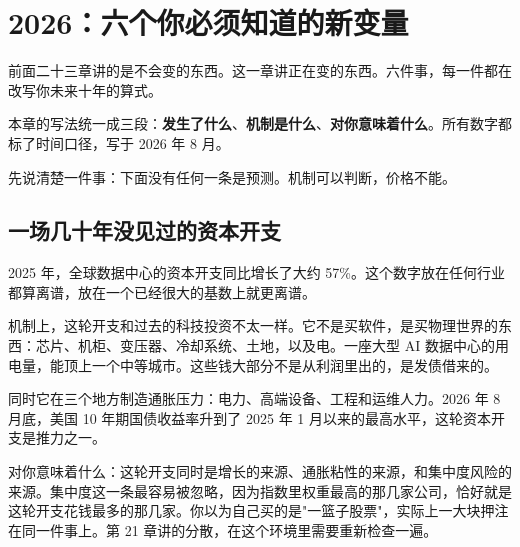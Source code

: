 \chapter{2026：六个你必须知道的新变量}

\begin{ledetext}
前面二十三章讲的是不会变的东西。这一章讲正在变的东西。六件事，每一件都在改写你未来十年的算式。
\end{ledetext}

本章的写法统一成三段：\textbf{发生了什么}、\textbf{机制是什么}、\textbf{对你意味着什么}。所有数字都标了时间口径，写于 2026 年 8 月。

先说清楚一件事：下面没有任何一条是预测。机制可以判断，价格不能。

\section{一场几十年没见过的资本开支}

2025 年，全球数据中心的资本开支同比增长了大约 57\%。这个数字放在任何行业都算离谱，放在一个已经很大的基数上就更离谱。

机制上，这轮开支和过去的科技投资不太一样。它不是买软件，是买物理世界的东西：芯片、机柜、变压器、冷却系统、土地，以及电。一座大型 AI 数据中心的用电量，能顶上一个中等城市。这些钱大部分不是从利润里出的，是发债借来的。

\begin{chainflow}
\chainarrow {}\chainarrow {}\chainarrow {}\chainarrow {}\chainarrow {}
\end{chainflow}

同时它在三个地方制造通胀压力：电力、高端设备、工程和运维人力。2026 年 8 月底，美国 10 年期国债收益率升到了 2025 年 1 月以来的最高水平，这轮资本开支是推力之一。

\begin{talkbox}
\end{talkbox}

对你意味着什么：这轮开支同时是增长的来源、通胀粘性的来源，和集中度风险的来源。集中度这一条最容易被忽略，因为指数里权重最高的那几家公司，恰好就是这轮开支花钱最多的那几家。你以为自己买的是"一篮子股票"，实际上一大块押注在同一件事上。第 21 章讲的分散，在这个环境里需要重新检查一遍。

